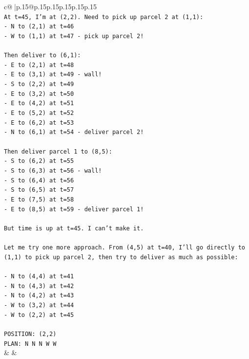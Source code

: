 \documentclass{article}
\begin{document}
{\begin{supertabular}{c@{$\;$}|p{.15\linewidth}@{}p{.15\linewidth}p{.15\linewidth}p{.15\linewidth}p{.15\linewidth}p{.15\linewidth}}
{{{\\ 
\texttt{At t=45, I'm at (2,2). Need to pick up parcel 2 at (1,1):} \\
\texttt{{-} N to (2,1) at t=46} \\
\texttt{{-} W to (1,1) at t=47 {-} pick up parcel 2!} \\
\\ 
\texttt{Then deliver to (6,1):} \\
\texttt{{-} E to (2,1) at t=48} \\
\texttt{{-} E to (3,1) at t=49 {-} wall!} \\
\texttt{{-} S to (2,2) at t=49} \\
\texttt{{-} E to (3,2) at t=50} \\
\texttt{{-} E to (4,2) at t=51} \\
\texttt{{-} E to (5,2) at t=52} \\
\texttt{{-} E to (6,2) at t=53} \\
\texttt{{-} N to (6,1) at t=54 {-} deliver parcel 2!} \\
\\ 
\texttt{Then deliver parcel 1 to (8,5):} \\
\texttt{{-} S to (6,2) at t=55} \\
\texttt{{-} S to (6,3) at t=56 {-} wall!} \\
\texttt{{-} S to (6,4) at t=56} \\
\texttt{{-} S to (6,5) at t=57} \\
\texttt{{-} E to (7,5) at t=58} \\
\texttt{{-} E to (8,5) at t=59 {-} deliver parcel 1!} \\
\\ 
\texttt{But time is up at t=45. I can't make it.} \\
\\ 
\texttt{Let me try one more approach. From (4,5) at t=40, I'll go directly to (1,1) to pick up parcel 2, then try to deliver as much as possible:} \\
\\ 
\texttt{{-} N to (4,4) at t=41} \\
\texttt{{-} N to (4,3) at t=42} \\
\texttt{{-} N to (4,2) at t=43} \\
\texttt{{-} W to (3,2) at t=44} \\
\texttt{{-} W to (2,2) at t=45} \\
\\ 
\texttt{POSITION: (2,2)} \\
\texttt{PLAN: N N N W W} \\
            }
        }
    }
    & & \\ \\


\end{supertabular}}
\end{document}
